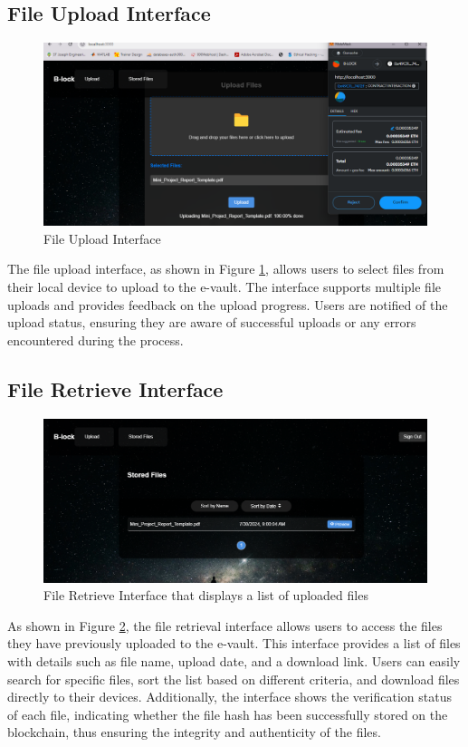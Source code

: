 \documentclass[12pt,a4paper]{report}
\begin{document}
\subsection{File Upload Interface}
\begin{figure}[hbtp]
    \centering
    \includegraphics[scale=0.4]{./pic/fileupload.png}
    \caption{File Upload Interface}
    \label{fig:fileupload}
\end{figure}
The file upload interface, as shown in Figure \ref{fig:fileupload}, allows users to select files from their local device to upload to the e-vault. The interface supports multiple file uploads and provides feedback on the upload progress. Users are notified of the upload status, ensuring they are aware of successful uploads or any errors encountered during the process.

\subsection{File Retrieve Interface}
\begin{figure}[hbtp]
    \centering
    \includegraphics[scale=0.4]{./pic/retrieve.png}
    \caption{File Retrieve Interface that displays a list of uploaded files}
    \label{fig:retrieve}
\end{figure}
As shown in Figure \ref{fig:retrieve}, the file retrieval interface allows users to access the files they have previously uploaded to the e-vault. This interface provides a list of files with details such as file name, upload date, and a download link. Users can easily search for specific files, sort the list based on different criteria, and download files directly to their devices. Additionally, the interface shows the verification status of each file, indicating whether the file hash has been successfully stored on the blockchain, thus ensuring the integrity and authenticity of the files.
\end{document}
